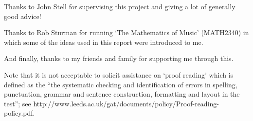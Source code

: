 Thanks to John Stell for supervising this project and giving a lot of generally
good advice!

Thanks to Rob Sturman for running `The Mathematics of Music' (MATH2340) in which
some of the ideas used in this report were introduced to me.

And finally, thanks to my friends and family for supporting me through this.

\vspace{1cm}

Note that it is not acceptable to solicit assistance on `proof reading' which is
defined as the ``the systematic checking and identification of errors in
spelling, punctuation, grammar and sentence construction, formatting and layout
in the test''; see http://www.leeds.ac.uk/gat/documents/policy/Proof-reading-policy.pdf.

